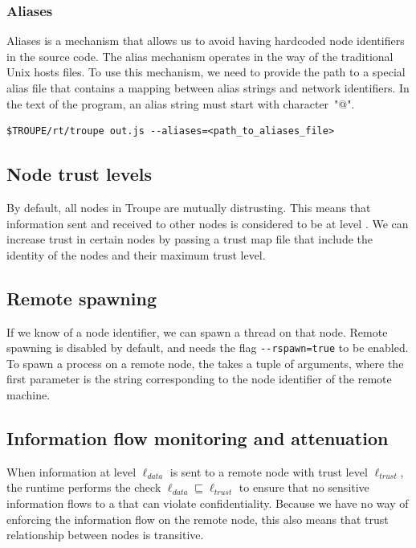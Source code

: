 \subsubsection{Aliases}
Aliases is a mechanism that allows us to avoid having hardcoded node identifiers in the source code. 
The alias mechanism operates in the way of the traditional Unix hosts files.
To use this mechanism, we need to provide the path to a special alias file that contains a mapping between
alias strings and network identifiers. In the text of the program, an alias string must start with character~"@".


\begin{verbatim}
$TROUPE/rt/troupe out.js --aliases=<path_to_aliases_file>
\end{verbatim}

\subsection{Node trust levels}

By default, all nodes in Troupe are mutually distrusting. This means that 
information sent and received to other nodes is considered to be at level \lev{}.
We can increase trust in certain nodes by 
passing a trust map file that include the identity of the nodes and their maximum
trust level.

    
\subsection{Remote spawning}
If we know of a node identifier, we can spawn a thread on that node. Remote spawning is 
disabled by default, and needs the flag {\verb|--rspawn=true|} to be enabled.
%
To spawn a process on a remote node, the  takes a tuple of arguments,
where the first parameter is the string corresponding to the node identifier of the remote machine.


\subsection{Information flow monitoring and attenuation}
When information at level $\ell_{\mathit{data}}$ is sent to a remote node with trust level 
$\ell_{\mathit{trust}}$, the runtime performs the check
$\ell_{\mathit{data}} \sqsubseteq \ell_{\mathit{trust}}$ to ensure that no sensitive information 
flows to a that can violate confidentiality. Because we have no way of enforcing the 
information flow on the remote node, this also means that 
trust relationship between nodes is transitive.

